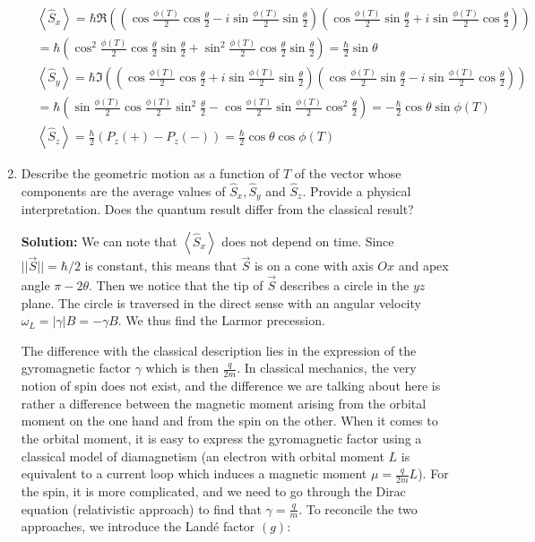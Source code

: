 \documentclass{article}
\begin{document}
\begin{enumerate}
{    $$
    \begin{aligned}
    & \left\langle\hat{S}_{x}\right\rangle = \hbar \Re\left(\left(\cos \frac{\phi(T)}{2} \cos \frac{\theta}{2} - i \sin \frac{\phi(T)}{2} \sin \frac{\theta}{2}\right)\left(\cos \frac{\phi(T)}{2} \sin \frac{\theta}{2} + i \sin \frac{\phi(T)}{2} \cos \frac{\theta}{2}\right)\right) \\
    & = \hbar\left(\cos ^{2} \frac{\phi(T)}{2} \cos \frac{\theta}{2} \sin \frac{\theta}{2} + \sin ^{2} \frac{\phi(T)}{2} \cos \frac{\theta}{2} \sin \frac{\theta}{2}\right) = \frac{\hbar}{2} \sin \theta \\
    & \left\langle\hat{S}_{y}\right\rangle = \hbar \Im\left(\left(\cos \frac{\phi(T)}{2} \cos \frac{\theta}{2} + i \sin \frac{\phi(T)}{2} \sin \frac{\theta}{2}\right)\left(\cos \frac{\phi(T)}{2} \sin \frac{\theta}{2} - i \sin \frac{\phi(T)}{2} \cos \frac{\theta}{2}\right)\right) \\
    & = \hbar\left(\sin \frac{\phi(T)}{2} \cos \frac{\phi(T)}{2} \sin ^{2} \frac{\theta}{2} - \cos \frac{\phi(T)}{2} \sin \frac{\phi(T)}{2} \cos ^{2} \frac{\theta}{2}\right) = -\frac{\hbar}{2} \cos \theta \sin \phi(T) \\
    & \left\langle\hat{S}_{z}\right\rangle = \frac{\hbar}{2}\left(P_{z}(+) - P_{z}(-)\right) = \frac{\hbar}{2} \cos \theta \cos \phi(T)
    \end{aligned}
    $$}

    \item Describe the geometric motion as a function of $T$ of the vector whose components are the average values of $\hat{S}_{x}, \hat{S}_{y}$ and $\hat{S}_{z}$. Provide a physical interpretation. Does the quantum result differ from the classical result?

    {\color{red}\textbf{Solution:} We can note that $\left\langle\hat{S}_{x}\right\rangle$ does not depend on time. Since $||\vec{S}|| = \hbar / 2$ is constant, this means that $\vec{S}$ is on a cone with axis $Ox$ and apex angle $\pi - 2 \theta$. Then we notice that the tip of $\vec{S}$ describes a circle in the $yz$ plane. The circle is traversed in the direct sense with an angular velocity $\omega_{L} = |\gamma| B = -\gamma B$. We thus find the Larmor precession.

    The difference with the classical description lies in the expression of the gyromagnetic factor $\gamma$ which is then $\frac{q}{2 m}$. In classical mechanics, the very notion of spin does not exist, and the difference we are talking about here is rather a difference between the magnetic moment arising from the orbital moment on the one hand and from the spin on the other. When it comes to the orbital moment, it is easy to express the gyromagnetic factor using a classical model of diamagnetism (an electron with orbital moment $L$ is equivalent to a current loop which induces a magnetic moment $\mu = \frac{q}{2 m} L$). For the spin, it is more complicated, and we need to go through the Dirac equation (relativistic approach) to find that $\gamma = \frac{q}{m}$. To reconcile the two approaches, we introduce the Landé factor $(g)$:

}
\end{enumerate}
\end{document}

